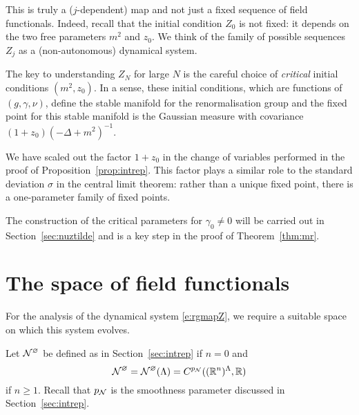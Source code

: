 \begin{rk}
\label{rk:crit-params}
This is truly a ($j$-dependent) map and not just a fixed sequence of field
functionals.  Indeed, recall that the initial condition $Z_0$ is not fixed:
it depends on the two free parameters $m^2$ and $z_0$. We think of the family
of possible sequences $Z_j$ as a (non-autonomous) dynamical system.

The key to understanding
$Z_N$ for large $N$ is the careful choice of \emph{critical} initial conditions
$(m^2, z_0)$. In a sense, these initial conditions, which are functions of
$(g, \gamma, \nu)$, define the stable manifold for the renormalisation group
and the fixed point for this stable manifold is the Gaussian measure with covariance
$(1 + z_0) (-\Delta + m^2)^{-1}$.

We have scaled out the factor $1 + z_0$
in the change of variables performed in the proof of Proposition~\ref{prop:intrep}.
This factor plays a similar role to the standard deviation $\sigma$ in the central
limit theorem: rather than a unique fixed point, there is a one-parameter family
of fixed points.

The construction of the critical parameters for $\gamma_0 \ne 0$ will be carried
out in Section~\ref{sec:nuztilde} and is a key step in the proof of Theorem~\ref{thm:mr}.
\end{rk}


\section{The space of field functionals}
\label{sec:Ncal}

For the analysis of the dynamical system \eqref{e:rgmapZ}, we require a suitable
space on which this system evolves.

Let $\mathcal{N}^\varnothing$ be defined as in Section~\ref{sec:intrep} if $n = 0$ and
\begin{equation}
\label{e:Ncaldef}
\mathcal{N}^\varnothing
	= \mathcal{N}^\varnothing(\Lambda)
	= C^{p_{\mathcal{N}}}(({\mathbb R}^n)^\Lambda,{\mathbb R})
\end{equation}
if $n \ge 1$. Recall that $p_{\mathcal{N}}$ is the smoothness parameter discussed in
Section~\ref{sec:intrep}.

